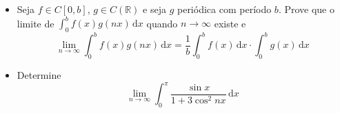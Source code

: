 \begin{itemize}
\item[(a)] Seja \(f\in C[0,b]\), \(g\in C(\mathbb R)\) e seja \(g\) periódica com período \(b\). Prove que o limite de \(\int_0^b f(x) g(nx)\,\mathrm dx\) quando \(n\to\infty\) existe e
\[\lim_{n\to\infty}\int_0^b f(x)g(nx)\,\mathrm dx=\frac 1b \int_0^b f(x)\,\mathrm dx\cdot\int_0^b g(x)\,\mathrm dx\]
\item[(b)] Determine
\[\lim_{n\to\infty}\int_0^\pi \frac{\sin x}{1+3\cos^2nx}\,\mathrm dx\]
\end{itemize}
